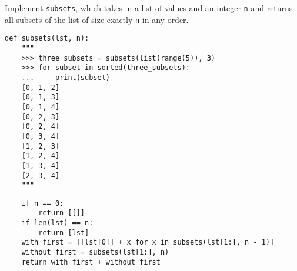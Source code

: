 \begin{blocksection}
\question Implement \lstinline$subsets$, which takes in a list of values and an
integer \lstinline$n$ and returns all subsets of the list of size exactly
\lstinline$n$ in any order.

\begin{lstlisting}
def subsets(lst, n):
    """
    >>> three_subsets = subsets(list(range(5)), 3)
    >>> for subset in sorted(three_subsets):
    ...     print(subset)
    [0, 1, 2]
    [0, 1, 3]
    [0, 1, 4]
    [0, 2, 3]
    [0, 2, 4]
    [0, 3, 4]
    [1, 2, 3]
    [1, 2, 4]
    [1, 3, 4]
    [2, 3, 4]
    """
\end{lstlisting}

\begin{solution}[1.5in]
\begin{lstlisting}
    if n == 0:
        return [[]]
    if len(lst) == n:
        return [lst]
    with_first = [[lst[0]] + x for x in subsets(lst[1:], n - 1)]
    without_first = subsets(lst[1:], n)
    return with_first + without_first
\end{lstlisting}
\end{solution}
\end{blocksection}
